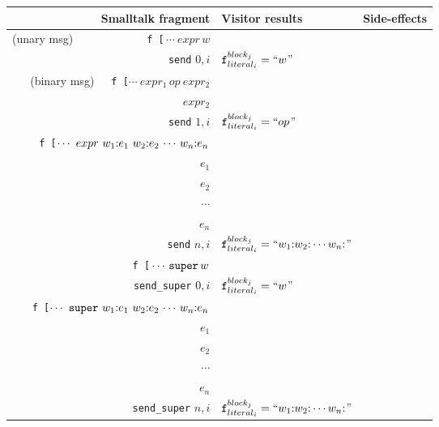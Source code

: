 \documentclass[11pt]{article}
\begin{document}

\def\arraystretch{1.0}

\begin{figure}
\begin{center}
\begin{tabular}[t]{r | l | l }
{\bf Smalltalk fragment} & {\bf Visitor results} & {\bf Side-effects}\\
\hline
(unary msg)~~~~~~~~~~~~\, {\tt f\,[}\,$\cdots ~expr \,w$ &
\begin{minipage}[t]{0.2\linewidth}
$expr$\\
{\tt send} $0,i$\vspace{5pt}
\end{minipage}  & $\text{\tt f}^{block_j}_{literal_i} = ``w$'' \\

(binary msg)~~~{\tt f\,[}$\cdots ~expr_1\, op~ expr_2$ &
\begin{minipage}[t]{0.2\linewidth}
$expr_1$\\
$expr_2$\\
{\tt send} $1,i$\vspace{5pt}
\end{minipage}  & $\text{\tt f}^{block_j}_{literal_i} = ``op$'' \\

{\tt f\,[}$\cdots ~expr ~w_1{\tt :} e_1 ~ w_2{\tt :} e_2 \, \cdots \, w_n{\tt :} e_n$ &
\begin{minipage}[t]{0.2\linewidth}
$expr$\\
$e_1$\\
$e_2$\\
$\cdots$\\
$e_n$\\
{\tt send} $n,i$\vspace{5pt}
\end{minipage}  & $\text{\tt f}^{block_j}_{literal_i} = ``w_1{\tt :}w_2{\tt :}\cdots w_n{\tt :}$'' \\

{\tt f\,[}$\,\cdots \,{\tt super} \,w$ &
\begin{minipage}[t]{0.2\linewidth}
{\tt self}\\
{\tt send\_super} $0,i$\vspace{5pt}
\end{minipage}  & $\text{\tt f}^{block_j}_{literal_i} = ``w$'' \\

{\tt f\,[}$\cdots ~{\tt super} ~w_1{\tt :} e_1 ~ w_2{\tt :} e_2 \, \cdots \, w_n{\tt :} e_n$ &
\begin{minipage}[t]{0.2\linewidth}
{\tt self}\\
$e_1$\\
$e_2$\\
$\cdots$\\
$e_n$\\
{\tt send\_super} $n,i$\vspace{3pt}
\end{minipage}  & $\text{\tt f}^{block_j}_{literal_i} = ``w_1{\tt :}w_2{\tt :}\cdots w_n{\tt :}$''\\


\end{tabular}
\end{center}
\end{figure}
\end{document}
